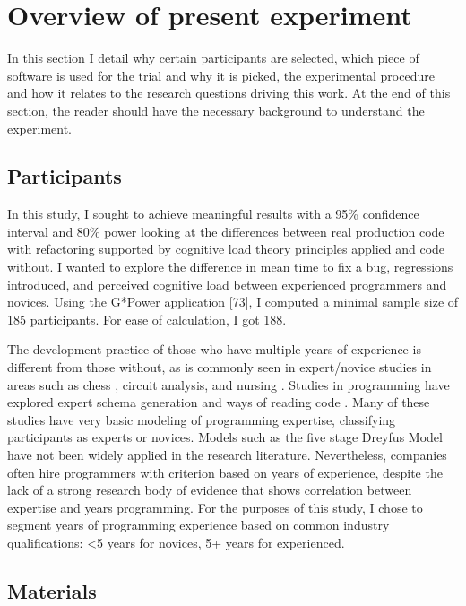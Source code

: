 \chapter{Overview of present experiment}
\graphicspath{{./images/ch3/}}

In this section I detail why certain participants are selected, which piece of software is used for the trial and why it is picked, the experimental procedure and how it relates to the research questions driving this work. At the end of this section, the reader should have the necessary background to understand the experiment.

\section{Participants}

In this study, I sought to achieve meaningful results with a 95\% confidence interval and 80\% power looking at the differences between real production code with refactoring supported by cognitive load theory principles applied and code without. I wanted to explore the difference in mean time to fix a bug, regressions introduced, and perceived cognitive load between experienced programmers and novices. Using the G*Power application [73], I computed a minimal sample size of 185 participants. For ease of calculation, I got 188.

The development practice of those who have multiple years of experience is different from those without, as is commonly seen in expert/novice studies in areas such as chess \cite{Degroot1968}, circuit analysis\cite{Egan1979}, and nursing \cite{Benner2004}. Studies in programming have explored expert schema generation and ways of reading code \cite{Ehlrich1984,Curtis1984,Rist1986}. Many of these studies have very basic modeling of programming expertise, classifying participants as experts or novices. Models such as the five stage Dreyfus Model \cite{Dreyfus1980} have not been widely applied in the research literature. Nevertheless, companies often hire programmers with criterion based on years of experience, despite the lack of a strong research body of evidence that shows correlation between expertise and years programming. For the purposes of this study, I chose to segment years of programming experience based on common industry qualifications: \textless  5 years for novices, 5+ years for experienced.

\section{Materials}

